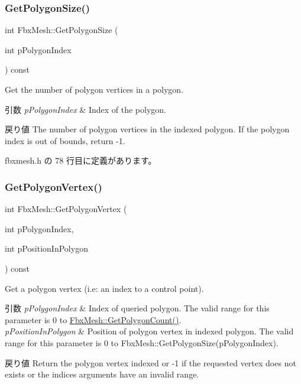 \subsubsection{\texorpdfstring{Get\+Polygon\+Size()}{GetPolygonSize()}}
{\footnotesize\ttfamily int Fbx\+Mesh\+::\+Get\+Polygon\+Size (\begin{DoxyParamCaption}\item[{int}]{p\+Polygon\+Index }\end{DoxyParamCaption}) const\hspace{0.3cm}{\ttfamily [inline]}}

Get the number of polygon vertices in a polygon. 
\begin{DoxyParams}{引数}
{\em p\+Polygon\+Index} & Index of the polygon. \\
\hline
\end{DoxyParams}
\begin{DoxyReturn}{戻り値}
The number of polygon vertices in the indexed polygon. If the polygon index is out of bounds, return -\/1. 
\end{DoxyReturn}


 fbxmesh.\+h の 78 行目に定義があります。

\mbox{\label{class_fbx_mesh_ad1875b3c43e44bf960e371cd668734b3}} 
\subsubsection{\texorpdfstring{Get\+Polygon\+Vertex()}{GetPolygonVertex()}}
{\footnotesize\ttfamily int Fbx\+Mesh\+::\+Get\+Polygon\+Vertex (\begin{DoxyParamCaption}\item[{int}]{p\+Polygon\+Index,  }\item[{int}]{p\+Position\+In\+Polygon }\end{DoxyParamCaption}) const\hspace{0.3cm}{\ttfamily [inline]}}

Get a polygon vertex (i.\+e\+: an index to a control point). 
\begin{DoxyParams}{引数}
{\em p\+Polygon\+Index} & Index of queried polygon. The valid range for this parameter is 0 to {\ttfamily \hyperlink{class_fbx_mesh_a0f443f6d64284e6b60bdd52fb1f53ea7}{Fbx\+Mesh\+::\+Get\+Polygon\+Count()}}. \\
\hline
{\em p\+Position\+In\+Polygon} & Position of polygon vertex in indexed polygon. The valid range for this parameter is 0 to {\ttfamily Fbx\+Mesh\+::\+Get\+Polygon\+Size(p\+Polygon\+Index)}. \\
\hline
\end{DoxyParams}
\begin{DoxyReturn}{戻り値}
Return the polygon vertex indexed or -\/1 if the requested vertex does not exists or the indices arguments have an invalid range. 
\end{DoxyReturn}


